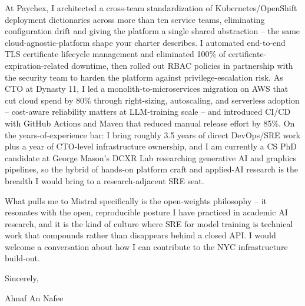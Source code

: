 \documentclass[letterpaper,11pt]{article}
\begin{document}
At Paychex, I architected a cross-team standardization of Kubernetes/OpenShift deployment dictionaries across more than ten service teams, eliminating configuration drift and giving the platform a single shared abstraction -- the same cloud-agnostic-platform shape your charter describes. I automated end-to-end TLS certificate lifecycle management and eliminated 100\% of certificate-expiration-related downtime, then rolled out RBAC policies in partnership with the security team to harden the platform against privilege-escalation risk. As CTO at Dynasty 11, I led a monolith-to-microservices migration on AWS that cut cloud spend by 80\% through right-sizing, autoscaling, and serverless adoption -- cost-aware reliability matters at LLM-training scale -- and introduced CI/CD with GitHub Actions and Maven that reduced manual release effort by 85\%. On the years-of-experience bar: I bring roughly 3.5 years of direct DevOps/SRE work plus a year of CTO-level infrastructure ownership, and I am currently a CS PhD candidate at George Mason's DCXR Lab researching generative AI and graphics pipelines, so the hybrid of hands-on platform craft and applied-AI research is the breadth I would bring to a research-adjacent SRE seat.

What pulls me to Mistral specifically is the open-weights philosophy -- it resonates with the open, reproducible posture I have practiced in academic AI research, and it is the kind of culture where SRE for model training is technical work that compounds rather than disappears behind a closed API. I would welcome a conversation about how I can contribute to the NYC infrastructure build-out.

Sincerely,

\vspace{18pt}
Ahnaf An Nafee
\end{document}
